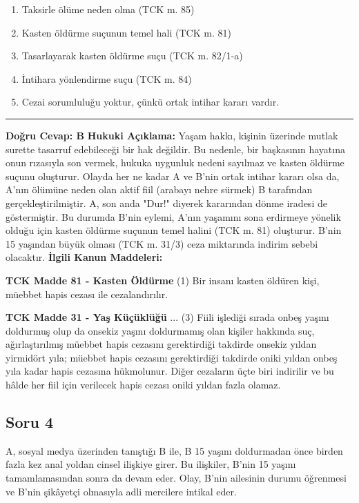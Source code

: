 \documentclass[a4paper, 11pt, twocolumn]{article}
\newenvironment{lawbox}{%
    \par\noindent
    \begin{tcolorbox}[
        colback=lawbg,
        colframe=boxcolor,
        fonttitle=\bfseries,
        boxrule=0.5pt,
        left=3pt,
        right=3pt,
        top=3pt,
        bottom=3pt,
        width=\columnwidth,
        arc=2pt,
        before skip=0.2cm,
        after skip=0.2cm
    ]
    \footnotesize\itshape
}{\end{tcolorbox}}
\begin{document}
\begin{enumerate}[label=\Alph*)]
    \item Taksirle ölüme neden olma (TCK m. 85)
    \item Kasten öldürme suçunun temel hali (TCK m. 81)
    \item Tasarlayarak kasten öldürme suçu (TCK m. 82/1-a)
    \item İntihara yönlendirme suçu (TCK m. 84)
    \item Cezai sorumluluğu yoktur, çünkü ortak intihar kararı vardır.
\end{enumerate}
\vspace{0.5cm}
\hrule
\vspace{0.5cm}
\textbf{Doğru Cevap: B}
\newline
\textbf{Hukuki Açıklama:} Yaşam hakkı, kişinin üzerinde mutlak surette tasarruf edebileceği bir hak değildir. Bu nedenle, bir başkasının hayatına onun rızasıyla son vermek, hukuka uygunluk nedeni sayılmaz ve kasten öldürme suçunu oluşturur. Olayda her ne kadar A ve B'nin ortak intihar kararı olsa da, A'nın ölümüne neden olan aktif fiil (arabayı nehre sürmek) B tarafından gerçekleştirilmiştir. A, son anda "Dur!" diyerek kararından dönme iradesi de göstermiştir. Bu durumda B'nin eylemi, A'nın yaşamını sona erdirmeye yönelik olduğu için kasten öldürme suçunun temel halini (TCK m. 81) oluşturur. B'nin 15 yaşından büyük olması (TCK m. 31/3) ceza miktarında indirim sebebi olacaktır.
\vspace{0.5cm}
\textbf{İlgili Kanun Maddeleri:}
\begin{lawbox}
\textbf{TCK Madde 81 - Kasten Öldürme}
\newline
(1) Bir insanı kasten öldüren kişi, müebbet hapis cezası ile cezalandırılır.
\end{lawbox}
\begin{lawbox}
\textbf{TCK Madde 31 - Yaş Küçüklüğü}
\newline
...
(3) Fiili işlediği sırada onbeş yaşını doldurmuş olup da onsekiz yaşını doldurmamış olan kişiler hakkında suç, ağırlaştırılmış müebbet hapis cezasını gerektirdiği takdirde onsekiz yıldan yirmidört yıla; müebbet hapis cezasını gerektirdiği takdirde oniki yıldan onbeş yıla kadar hapis cezasına hükmolunur. Diğer cezaların üçte biri indirilir ve bu hâlde her fiil için verilecek hapis cezası oniki yıldan fazla olamaz.
\end{lawbox}

\newpage

\subsection*{Soru 4}
A, sosyal medya üzerinden tanıştığı B ile, B 15 yaşını doldurmadan önce birden fazla kez anal yoldan cinsel ilişkiye girer. Bu ilişkiler, B'nin 15 yaşını tamamlamasından sonra da devam eder. Olay, B'nin ailesinin durumu öğrenmesi ve B'nin şikâyetçi olmasıyla adli mercilere intikal eder.
\end{document}
